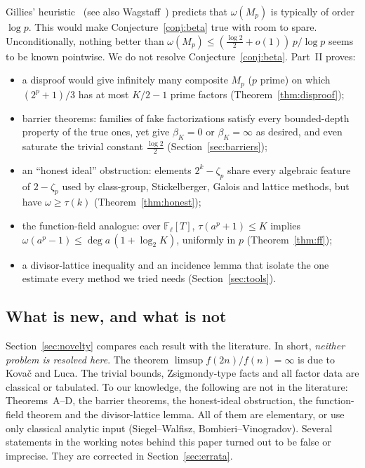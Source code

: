 \documentclass[11pt]{amsart}
\theoremstyle{definition}
\theoremstyle{remark}
\newcommand{\F}{\mathbb{F}}
\begin{document}
Gillies' heuristic~\cite{Gi64} (see also Wagstaff~\cite{Wa83}) predicts that $\omega(M_p)$ is typically of
order $\log p$. This would make
Conjecture~\ref{conj:beta} true with room to spare. Unconditionally, nothing better than
$\omega(M_p)\le(\frac{\log2}{2}+o(1))\,p/\log p$ seems to be known pointwise. We do not resolve
Conjecture~\ref{conj:beta}. Part~II proves:
\begin{itemize}
\item a disproof would give infinitely many composite $M_p$ ($p$ prime) on which $(2^p+1)/3$ has at most $K/2-1$
prime factors (Theorem~\ref{thm:disproof});
\item barrier theorems: families of fake factorizations satisfy every bounded-depth property of the true ones, yet give
$\beta_K=0$ or $\beta_K=\infty$ as desired, and even saturate the trivial constant $\frac{\log2}2$
(Section~\ref{sec:barriers});
\item an ``honest ideal'' obstruction: elements $2^k-\zeta_p$ share every algebraic feature of $2-\zeta_p$ used by
class-group, Stickelberger, Galois and lattice methods, but have $\omega\ge\tau(k)$ (Theorem~\ref{thm:honest});
\item the function-field analogue: over $\F_\ell[T]$, $\tau(a^p+1)\le K$ implies
$\omega(a^p-1)\le\deg a\,(1+\log_2K)$, uniformly in $p$ (Theorem~\ref{thm:ff});
\item a divisor-lattice inequality and an incidence lemma that isolate the one estimate every method we tried needs
(Section~\ref{sec:tools}).
\end{itemize}

\subsection{What is new, and what is not}
Section~\ref{sec:novelty} compares each result with the literature. In short, \emph{neither problem is resolved here}.
The theorem $\limsup f(2n)/f(n)=\infty$ is due to Kova\v{c} and Luca. The trivial bounds, Zsigmondy-type facts and all factor
data are classical or tabulated. To our knowledge, the following are not in the literature: Theorems~A--D, the barrier
theorems, the honest-ideal obstruction, the function-field theorem and the divisor-lattice lemma.
All of them are elementary, or use only classical analytic input (Siegel--Walfisz, Bombieri--Vinogradov).
Several statements in the working notes behind this paper turned out to be false or imprecise.
They are corrected in Section~\ref{sec:errata}.
\end{document}
